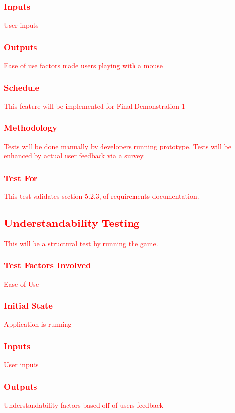 \documentclass[11pt, oneside]{article}   	%
\begin{document}
\subsubsection{\textcolor{red}{Inputs}}
\textcolor{red}{User inputs}
\subsubsection{\textcolor{red}{Outputs}}
\textcolor{red}{Ease of use factors made users playing with a mouse}
\subsubsection{\textcolor{red}{Schedule}}
\textcolor{red}{This feature will be implemented for Final Demonstration 1}
\subsubsection{\textcolor{red}{Methodology}}
\textcolor{red}{Tests will be done manually by developers running prototype. Tests will be enhanced by actual user feedback via a survey.}
\subsubsection{\textcolor{red}{Test For}}
\textcolor{red}{This test validates section 5.2.3, of requirements documentation.}



\subsection{\textcolor{red}{Understandability Testing}}
\textcolor{red}{This will be a structural test by running the game.}
\subsubsection{\textcolor{red}{Test Factors Involved}}
\textcolor{red}{Ease of Use}
\subsubsection{\textcolor{red}{Initial State}}
\textcolor{red}{Application is running}
\subsubsection{\textcolor{red}{Inputs}}
\textcolor{red}{User inputs}
\subsubsection{\textcolor{red}{Outputs}}
\textcolor{red}{Understandability factors based off of users feedback}
\end{document}
